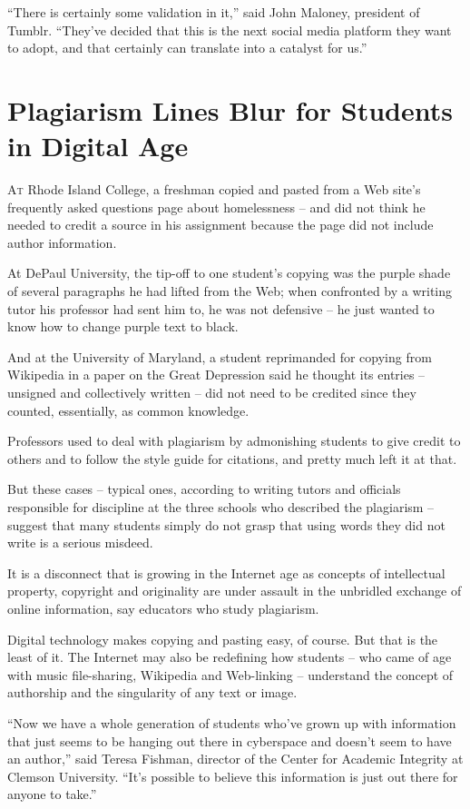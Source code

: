 ﻿\documentclass[12pt]{article}
\begin{document}
``There is certainly some validation in it,'' said John Maloney, president of Tumblr. ``They've
decided that this is the next social media platform they want to adopt, and that certainly can
translate into a catalyst for us.''

\section{Plagiarism Lines Blur for Students in Digital Age}

\lettrine{A}{t} Rhode Island College, a freshman copied and pasted from a
Web site's frequently asked questions page about homelessness -- and did not think he needed to
credit a source in his assignment because the page did not include author information.

At DePaul University, the tip-off to one student's copying was the purple shade of several
paragraphs he had lifted from the Web; when confronted by a writing tutor his professor had sent him
to, he was not defensive -- he just wanted to know how to change purple text to black.

And at the University of Maryland, a student reprimanded for copying from Wikipedia in a paper on
the Great Depression said he thought its entries -- unsigned and collectively written -- did not
need to be credited since they counted, essentially, as common knowledge.

Professors used to deal with plagiarism by admonishing students to give credit to others and to
follow the style guide for citations, and pretty much left it at that.

But these cases -- typical ones, according to writing tutors and officials responsible for
discipline at the three schools who described the plagiarism -- suggest that many students simply do
not grasp that using words they did not write is a serious misdeed.

It is a disconnect that is growing in the Internet age as concepts of intellectual property,
copyright and originality are under assault in the unbridled exchange of online information, say
educators who study plagiarism.

Digital technology makes copying and pasting easy, of course. But that is the least of it. The
Internet may also be redefining how students -- who came of age with music file-sharing, Wikipedia
and Web-linking -- understand the concept of authorship and the singularity of any text or image.

``Now we have a whole generation of students who've grown up with information that just seems to be
hanging out there in cyberspace and doesn't seem to have an author,'' said Teresa Fishman, director
of the Center for Academic Integrity at Clemson University. ``It's possible to believe this
information is just out there for anyone to take.''
\end{document}
